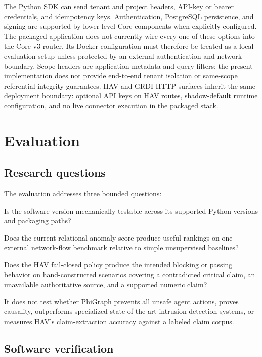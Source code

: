 \documentclass[11pt]{article}
\begin{document}
The Python SDK can send tenant and project headers, API-key or bearer
credentials, and idempotency keys. Authentication, PostgreSQL persistence, and
signing are supported by lower-level Core components when explicitly
configured. The packaged application does not currently wire every one of
these options into the Core v3 router. Its Docker configuration must therefore
be treated as a local evaluation setup unless protected by an external
authentication and network boundary. Scope headers are application metadata
and query filters; the present implementation does not provide end-to-end
tenant isolation or same-scope referential-integrity guarantees. HAV and GRDI
HTTP surfaces inherit the same deployment boundary: optional API keys on HAV
routes, shadow-default runtime configuration, and no live connector execution
in the packaged stack.

\section{Evaluation}

\subsection{Research questions}

The evaluation addresses three bounded questions:

\begin{description}[leftmargin=2.3cm,style=nextline]
  \item[RQ1] Is the software version mechanically testable across its supported Python
  versions and packaging paths?
  \item[RQ2] Does the current relational anomaly score produce useful rankings
  on one external network-flow benchmark relative to simple unsupervised
  baselines?
  \item[RQ3] Does the HAV fail-closed policy produce the intended blocking or
  passing behavior on hand-constructed scenarios covering a contradicted
  critical claim, an unavailable authoritative source, and a supported
  numeric claim?
\end{description}

It does not test whether PhiGraph prevents all unsafe agent actions, proves
causality, outperforms specialized state-of-the-art intrusion-detection
systems, or measures HAV's claim-extraction accuracy against a labeled claim
corpus.

\subsection{Software verification}
\end{document}
